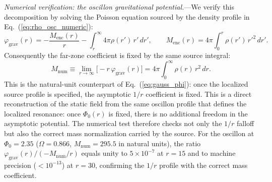\documentclass[aps,prd,onecolumn,superscriptaddress,nofootinbib,showpacs,12pt,notitlepage]{revtex4-2}
\begin{document}
\textit{Numerical verification: the oscillon gravitational
potential.}---We verify this decomposition
by solving the Poisson equation sourced by the density
profile in Eq.~(\ref{eq:rho_osc_numeric}):
\begin{equation}\label{eq:phi_grav_poisson}
  \varphi_{\mathrm{grav}}(r) =
  -\frac{M_{\mathrm{enc}}(r)}{r}
  - \int_{r}^{\infty}4\pi\rho(r')\,r'\,dr',\qquad
  M_{\mathrm{enc}}(r) = 4\pi\!\int_{0}^{r}\!\rho(r')\,r'^{2}\,dr'.
\end{equation}
Consequently the far-zone coefficient is fixed by the same
source integral:
\begin{equation}
  M_{\mathrm{num}}
  \equiv \lim_{r\to\infty}\!\bigl[-r\,\varphi_{\mathrm{grav}}(r)\bigr]
  = 4\pi\!\int_{0}^{\infty}\!\rho(r)\,r^{2}\,dr.
\end{equation}
This is the natural-unit counterpart of
Eq.~(\ref{eq:gauss_phi}): once the localized source profile is
specified, the asymptotic $1/r$ coefficient is fixed.
This is a direct reconstruction of the static field from the
same oscillon profile that defines the localized resonance:
once $\Phi_0(r)$ is fixed, there is no additional freedom in
the asymptotic potential.  The numerical test therefore checks
not only the $1/r$ falloff but also the correct mass
normalization carried by the source.
For the oscillon at $\Phi_0 = 2.35$ ($\Omega = 0.866$,
$M_{\mathrm{num}} = 295.5$ in natural units), the ratio
$\varphi_{\mathrm{grav}}(r)/(-M_{\mathrm{num}}/r)$ equals unity to
$5 \times 10^{-7}$ at $r = 15$ and to machine precision
($< 10^{-13}$) at $r = 30$, confirming the $1/r$ profile
with the correct mass coefficient.
\end{document}
